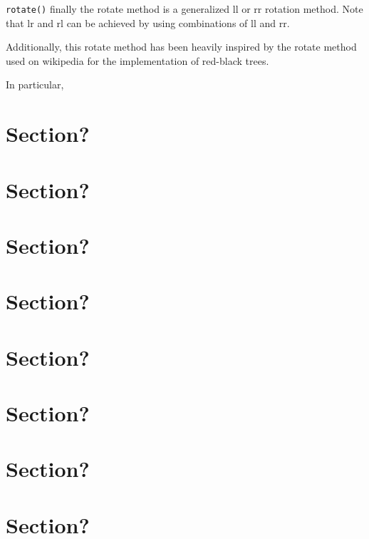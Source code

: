 \documentclass[article]{uom-coursework}
\begin{document}
\texttt{rotate()} finally the rotate
method is a generalized ll or rr
rotation method. Note that lr and
rl can be achieved by using combinations
of ll and rr.

Additionally, this rotate method has been heavily
inspired by the rotate method used on
wikipedia for the implementation
of red-black trees.

In particular,

\section{Section?}
\section{Section?}
\section{Section?}
\section{Section?}
\section{Section?}
\section{Section?}
\section{Section?}
\section{Section?}


\blindtext
\blindtext
\blindtext
\end{document}
